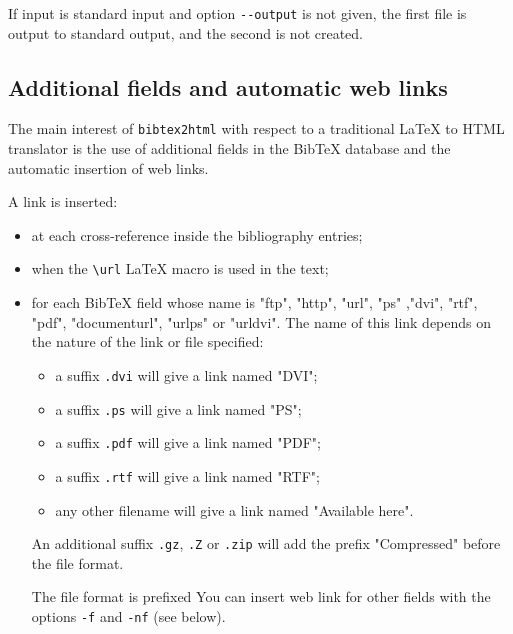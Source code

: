 \documentclass[11pt,a4paper]{article}
\begin{document}
If input is standard input and option \verb|--output| is not given,
the first file is output to standard output, and the second is not
created.


\subsection{Additional fields and automatic web links}

The main interest of \texttt{bibtex2html} with respect to a
traditional LaTeX to HTML translator is the use of additional fields
in the BibTeX database and the automatic insertion of web
links.

A link is inserted:
\begin{itemize}

\item  at each cross-reference inside the bibliography entries; 

\item  when the \verb|\url| LaTeX macro is used in the text; 

\item  for each BibTeX field whose name is "ftp", "http", "url", "ps"
  ,"dvi", "rtf", "pdf",
  "documenturl", "urlps" or "urldvi". The name of this link depends on
  the nature of the link or file specified: 
  \begin{itemize}
  \item a suffix \texttt{.dvi} will give a link named "DVI";
  \item a suffix \texttt{.ps} will give a link named "PS";
  \item a suffix \texttt{.pdf} will give a link named "PDF";
  \item a suffix \texttt{.rtf} will give a link named "RTF";
  \item any other filename will give a link named "Available here".
  \end{itemize}
  
  An additional suffix \texttt{.gz}, \texttt{.Z} or
  \texttt{.zip} will add the prefix "Compressed" before the
  file format.

  The file format is prefixed 
  You can insert web link for other fields with the options
  \texttt{-f} and \texttt{-nf} (see below).
  
\end{itemize}
\end{document}
